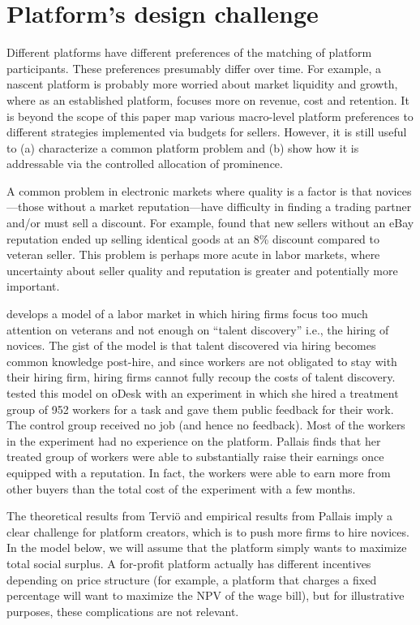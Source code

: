 % 

\section{Platform's design challenge} 
Different platforms have different preferences of the matching of
platform participants. These preferences presumably differ over
time. For example, a nascent platform is probably more worried about
market liquidity and growth, where as an established platform, focuses
more on revenue, cost and retention. It is beyond the scope of this
paper map various macro-level platform preferences to different
strategies implemented via budgets for sellers. However, it is still
useful to (a) characterize a common platform problem and (b) show how
it is addressable via the controlled allocation of prominence.

A common problem in electronic markets where quality is a factor is
that novices---those without a market reputation---have difficulty in
finding a trading partner and/or must sell a discount. For example,
\cite{resnick2006value} found that new sellers without an eBay
reputation ended up selling identical goods at an 8\% discount
compared to veteran seller. This problem is perhaps more acute in
labor markets, where uncertainty about seller quality and reputation
is greater and potentially more important. 

\cite{tervio2009superstars} develops a model of a labor market in
which hiring firms focus too much attention on veterans and not enough
on ``talent discovery'' i.e., the hiring of novices. The gist of the
model is that talent discovered via hiring becomes common knowledge
post-hire, and since workers are not obligated to stay with their
hiring firm, hiring firms cannot fully recoup the costs of talent
discovery. \cite{pallais2010inefficient} tested this model on oDesk
with an experiment in which she hired a treatment group of 952 workers
for a task and gave them public feedback for their work.  The control
group received no job (and hence no feedback). Most of the workers in
the experiment had no experience on the platform. Pallais finds that
her treated group of workers were able to substantially raise their
earnings once equipped with a reputation. In fact, the workers were
able to earn more from other buyers than the total cost of the
experiment with a few months.

The theoretical results from Tervi{\"o} and empirical results from
Pallais imply a clear challenge for platform creators, which is to
push more firms to hire novices. In the model below, we will assume
that the platform simply wants to maximize total social surplus. A
for-profit platform actually has different incentives depending on
price structure (for example, a platform that charges a fixed
percentage will want to maximize the NPV of the wage bill), but for
illustrative purposes, these complications are not relevant.

